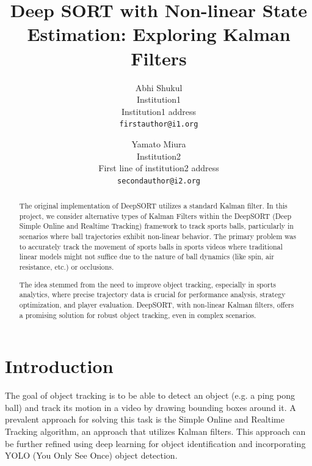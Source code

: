\documentclass[10pt,twocolumn,letterpaper]{article}
\begin{document}
\title{Deep SORT with Non-linear State Estimation: Exploring Kalman Filters}

\author{Abhi Shukul\\
Institution1\\
Institution1 address\\
{\tt\small firstauthor@i1.org}
\and
Yamato Miura\\
Institution2\\
First line of institution2 address\\
{\tt\small secondauthor@i2.org}
}
\maketitle

\begin{abstract}


  The original implementation of DeepSORT utilizes a standard Kalman filter. In this project, we consider alternative types of Kalman Filters within the 
  DeepSORT (Deep Simple Online and Realtime Tracking) 
  framework to track sports balls, particularly in scenarios where ball trajectories exhibit non-linear behavior. 
  The primary problem was to accurately track the movement of sports balls in sports videos where traditional linear 
  models might not suffice due to the nature of ball dynamics (like spin, air resistance, etc.) or occlusions.


  The idea stemmed from the need to improve object tracking, 
  especially in sports analytics, where precise trajectory data is crucial 
  for performance analysis, strategy optimization, and player evaluation. DeepSORT, with 
  non-linear Kalman filters, offers a promising solution for robust object tracking, even in complex scenarios. 

\end{abstract}

\section{Introduction}
\label{sec:intro}

  The goal of object tracking is to be able to detect an object (e.g. a ping pong ball) and 
  track its motion in a video by drawing bounding boxes around it. A prevalent approach for 
  solving this task is the Simple Online and Realtime Tracking algorithm, an approach that utilizes 
  Kalman filters. This approach can be further refined using deep learning for object identification and 
  incorporating YOLO (You Only See Once) object detection. 
  
\end{document}

